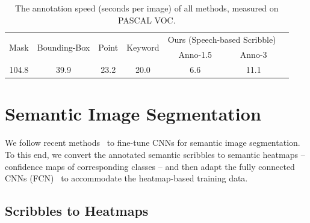 \begin{table}[tb]
   \centering \small
\setlength\tabcolsep{1.5mm} {
  \begin{tabular}{|c|c|c|c||c|c|c|}  \hline
       \multirow{2}{*}{Mask} & \multirow{2}{*}{Bounding-Box} & \multirow{2}{*}{Point}  & \multirow{2}{*}{Keyword} & \multicolumn{2}{c|}{Ours (Speech-based Scribble)}  \\ \cline{5-6}
         & & & & Anno-1.5 & Anno-3  \\   \cline{1-4}  \cline{5-6}
        104.8  & 39.9 &  23.2 & 20.0  &  6.6     & 11.1\\  \hline
       \end{tabular} }
       \caption{The annotation speed (seconds per image) of all methods, measured on PASCAL VOC.}
       \label{table:speed}  
\end{table}




\section{Semantic Image Segmentation}
\label{drawtell:sec:method}



We follow recent methods~\citep{rcnn, Long_2015_CVPR, crfasrnn} to
fine-tune CNNs for semantic image segmentation. To this end, we
convert the annotated semantic scribbles to semantic heatmaps --
confidence maps of corresponding classes -- and then adapt the fully
connected CNNs (FCN)~\citep{Long_2015_CVPR} to accommodate the
heatmap-based training data.

\subsection{Scribbles to Heatmaps} 
\label{drawtell:sec:scribble}

